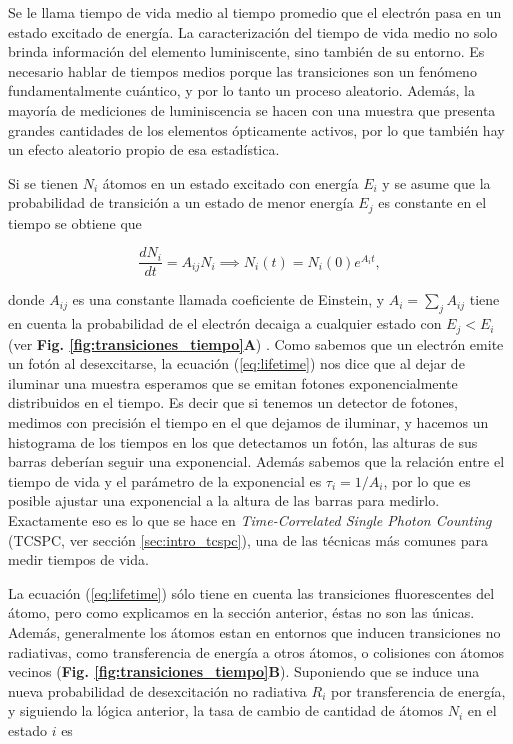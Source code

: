 Se le llama tiempo de vida medio al tiempo promedio que el electrón pasa en un estado excitado de energía.
La caracterización del tiempo de vida medio no solo brinda información del elemento luminiscente, sino también de su entorno.
Es necesario hablar de tiempos medios porque las transiciones son un fenómeno fundamentalmente cuántico, y por lo tanto un proceso aleatorio.
Además, la mayoría de mediciones de luminiscencia se hacen con una muestra que presenta grandes cantidades de los elementos ópticamente activos, por lo que también hay un efecto aleatorio propio de esa estadística.

Si se tienen $N_i$ átomos en un estado excitado con energía $E_i$ y se asume que la probabilidad de transición a un estado de menor energía $E_j$ es constante en el tiempo se obtiene que

\begin{equation} \label{eq:lifetime}
    \frac{dN_i}{dt} = A_{ij} N_i \implies N_i(t) = N_i(0)e^{A_i t},
\end{equation}

\noindent donde $A_{ij}$ es una constante llamada coeficiente de Einstein, y $A_i = \sum_{j} A_{ij}$ tiene en cuenta la probabilidad de el electrón decaiga a cualquier estado con $E_j < E_i$ (ver \textbf{Fig. \ref{fig:transiciones_tiempo}A}) \cite{demtroder_emission_2010}.
Como sabemos que un electrón emite un fotón al desexcitarse, la ecuación (\ref{eq:lifetime}) nos dice que al dejar de iluminar una muestra esperamos que se emitan fotones exponencialmente distribuidos en el tiempo.
Es decir que si tenemos un detector de fotones, medimos con precisión el tiempo en el que dejamos de iluminar, y hacemos un histograma de los tiempos en los que detectamos un fotón, las alturas de sus barras deberían seguir una exponencial.
Además sabemos que la relación entre el tiempo de vida y el parámetro de la exponencial es $\tau_i = 1/A_i$, por lo que es posible ajustar una exponencial a la altura de las barras para medirlo.
Exactamente eso es lo que se hace en \textit{Time-Correlated Single Photon Counting} (TCSPC, ver sección \ref{sec:intro_tcspc}), una de las técnicas más comunes para medir tiempos de vida.

La ecuación (\ref{eq:lifetime}) sólo tiene en cuenta las transiciones fluorescentes del átomo, pero como explicamos en la sección anterior, éstas no son las únicas.
Además, generalmente los átomos estan en entornos que inducen transiciones no radiativas, como transferencia de energía a otros átomos, o colisiones con átomos vecinos (\textbf{Fig. \ref{fig:transiciones_tiempo}B}). 
Suponiendo que se induce una nueva probabilidad de desexcitación no radiativa $R_i$ por transferencia de energía, y siguiendo la lógica anterior, la tasa de cambio de cantidad de átomos $N_i$ en el estado $i$ es

